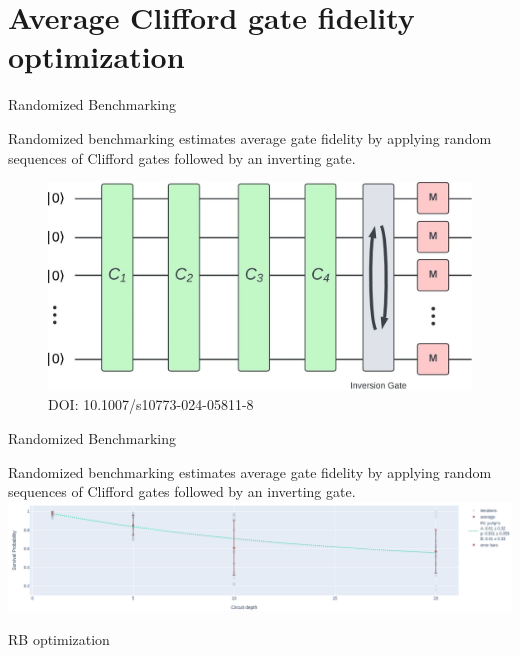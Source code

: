 \documentclass[aspectratio=169,10pt]{beamer}
\begin{document}
\section{Average Clifford gate fidelity optimization}

\begin{frame}[t,fragile]{Randomized Benchmarking}
\begin{center}
  Randomized benchmarking estimates average gate fidelity by applying random sequences of Clifford gates followed by an inverting gate.
  \vspace{3mm}
  \begin{figure}
      \includegraphics[height=0.52\textheight]{figures/RBcircuit.png}
      \caption{DOI: 10.1007/s10773-024-05811-8}
  \end{figure}
\end{center}
\end{frame}

\begin{frame}[t,fragile]{Randomized Benchmarking}
\begin{center}
  Randomized benchmarking estimates average gate fidelity by applying random sequences of Clifford gates followed by an inverting gate.
  \vfill
  \includegraphics[width=\textwidth]{figures/rb.png}
\end{center}
\end{frame}

\begin{frame}[t,fragile]{RB optimization}%
\end{frame}
\end{document}
